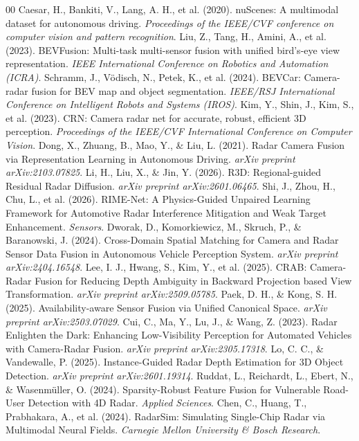 \documentclass[conference]{IEEEtran}
\begin{document}
\begin{thebibliography}{00}
 Caesar, H., Bankiti, V., Lang, A. H., et al. (2020). nuScenes: A multimodal dataset for autonomous driving. \textit{Proceedings of the IEEE/CVF conference on computer vision and pattern recognition}.
 Liu, Z., Tang, H., Amini, A., et al. (2023). BEVFusion: Multi-task multi-sensor fusion with unified bird's-eye view representation. \textit{IEEE International Conference on Robotics and Automation (ICRA)}.
 Schramm, J., Vödisch, N., Petek, K., et al. (2024). BEVCar: Camera-radar fusion for BEV map and object segmentation. \textit{IEEE/RSJ International Conference on Intelligent Robots and Systems (IROS)}.
 Kim, Y., Shin, J., Kim, S., et al. (2023). CRN: Camera radar net for accurate, robust, efficient 3D perception. \textit{Proceedings of the IEEE/CVF International Conference on Computer Vision}.
 Dong, X., Zhuang, B., Mao, Y., \& Liu, L. (2021). Radar Camera Fusion via Representation Learning in Autonomous Driving. \textit{arXiv preprint arXiv:2103.07825}.
 Li, H., Liu, X., \& Jin, Y. (2026). R3D: Regional-guided Residual Radar Diffusion. \textit{arXiv preprint arXiv:2601.06465}.
 Shi, J., Zhou, H., Chu, L., et al. (2026). RIME-Net: A Physics-Guided Unpaired Learning Framework for Automotive Radar Interference Mitigation and Weak Target Enhancement. \textit{Sensors}.
 Dworak, D., Komorkiewicz, M., Skruch, P., \& Baranowski, J. (2024). Cross-Domain Spatial Matching for Camera and Radar Sensor Data Fusion in Autonomous Vehicle Perception System. \textit{arXiv preprint arXiv:2404.16548}.
 Lee, I. J., Hwang, S., Kim, Y., et al. (2025). CRAB: Camera-Radar Fusion for Reducing Depth Ambiguity in Backward Projection based View Transformation. \textit{arXiv preprint arXiv:2509.05785}.
 Paek, D. H., \& Kong, S. H. (2025). Availability-aware Sensor Fusion via Unified Canonical Space. \textit{arXiv preprint arXiv:2503.07029}.
 Cui, C., Ma, Y., Lu, J., \& Wang, Z. (2023). Radar Enlighten the Dark: Enhancing Low-Visibility Perception for Automated Vehicles with Camera-Radar Fusion. \textit{arXiv preprint arXiv:2305.17318}.
 Lo, C. C., \& Vandewalle, P. (2025). Instance-Guided Radar Depth Estimation for 3D Object Detection. \textit{arXiv preprint arXiv:2601.19314}.
 Ruddat, L., Reichardt, L., Ebert, N., \& Wasenmüller, O. (2024). Sparsity-Robust Feature Fusion for Vulnerable Road-User Detection with 4D Radar. \textit{Applied Sciences}.
 Chen, C., Huang, T., Prabhakara, A., et al. (2024). RadarSim: Simulating Single-Chip Radar via Multimodal Neural Fields. \textit{Carnegie Mellon University \& Bosch Research}.

\end{thebibliography}
\end{document}
